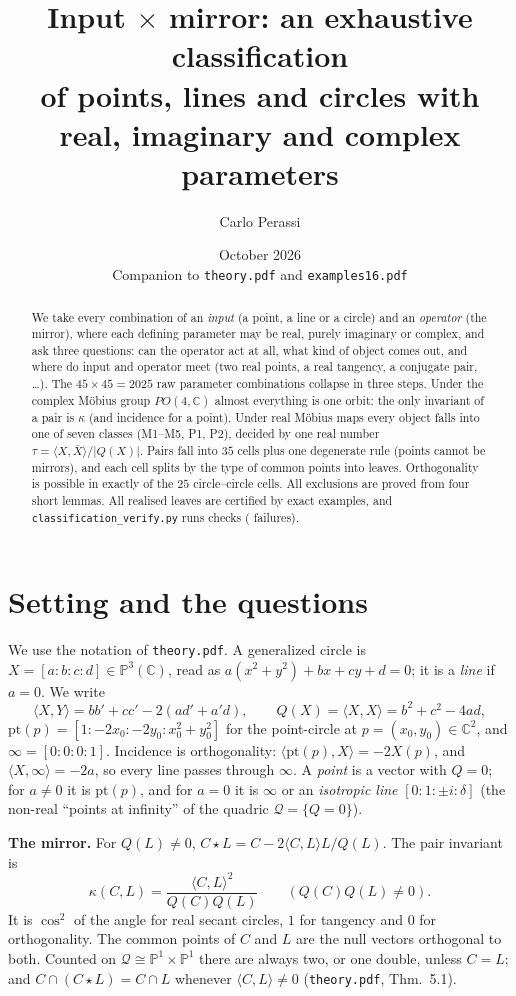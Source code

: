 \documentclass[11pt]{article}
\title{Input $\times$ mirror: an exhaustive classification\\ of points, lines and circles with real, imaginary and complex parameters}
\author{Carlo Perassi}
\date{October 2026\\\small Companion to \texttt{theory.pdf} and \texttt{examples16.pdf}}
\theoremstyle{definition}\newtheorem{definition}[theorem]{Definition}\newtheorem{remark}[theorem]{Remark}\newtheorem{example}[theorem]{Example}
\newcommand{\C}{\mathbb{C}}\newcommand{\R}{\mathbb{R}}\newcommand{\PP}{\mathbb{P}}
\newcommand{\ip}[2]{\langle #1,#2\rangle}\newcommand{\pt}{\mathrm{pt}}\newcommand{\Qd}{\mathcal{Q}}
\newcommand{\cls}[1]{\textsf{#1}}
\begin{document}
\maketitle
\begin{abstract}
We take every combination of an \emph{input} (a point, a line or a circle) and an \emph{operator} (the mirror), where each defining parameter may be real, purely imaginary or complex, and ask three questions: can the operator act at all, what kind of object comes out, and where do input and operator meet (two real points, a real tangency, a conjugate pair, \dots). The $45\times45=2025$ raw parameter combinations collapse in three steps. Under the complex Möbius group $PO(4,\C)$ almost everything is one orbit: the only invariant of a pair is $\kappa$ (and incidence for a point). Under real Möbius maps every object falls into one of seven classes (\cls{M1}--\cls{M5}, \cls{P1}, \cls{P2}), decided by one real number $\tau=\ip X{\bar X}/|Q(X)|$. Pairs fall into $35$ cells plus one degenerate rule (points cannot be mirrors), and each cell splits by the type of common points into \cntleaf{} leaves. Orthogonality is possible in exactly \cntorthcells{} of the $25$ circle--circle cells. All exclusions are proved from four short lemmas. All \cntrows{} realised leaves are certified by exact examples, and \texttt{classification\_verify.py} runs \cntpass{} checks (\cntfail{} failures).
\end{abstract}
\tableofcontents

\section{Setting and the questions}\label{sec:setting}
We use the notation of \texttt{theory.pdf}. A generalized circle is $X=[a:b:c:d]\in\PP^3(\C)$, read as $a(x^2+y^2)+bx+cy+d=0$; it is a \emph{line} if $a=0$. We write
\[\ip XY=bb'+cc'-2(ad'+a'd),\qquad Q(X)=\ip XX=b^2+c^2-4ad,\]
$\pt(p)=[1:-2x_0:-2y_0:x_0^2+y_0^2]$ for the point-circle at $p=(x_0,y_0)\in\C^2$, and $\infty=[0:0:0:1]$. Incidence is orthogonality: $\ip{\pt(p)}X=-2X(p)$, and $\ip X\infty=-2a$, so every line passes through $\infty$. A \emph{point} is a vector with $Q=0$; for $a\neq0$ it is $\pt(p)$, and for $a=0$ it is $\infty$ or an \emph{isotropic line} $[0:1:\pm i:\delta]$ (the non-real ``points at infinity'' of the quadric $\Qd=\{Q=0\}$).

\textbf{The mirror.} For $Q(L)\neq0$, $C\star L=C-2\ip CL L/Q(L)$. The pair invariant is
\[\kappa(C,L)=\frac{\ip CL^2}{Q(C)Q(L)}\qquad(Q(C)Q(L)\neq0).\]
It is $\cos^2$ of the angle for real secant circles, $1$ for tangency and $0$ for orthogonality. The common points of $C$ and $L$ are the null vectors orthogonal to both. Counted on $\Qd\cong\PP^1\times\PP^1$ there are always two, or one double, unless $C=L$; and $C\cap(C\star L)=C\cap L$ whenever $\ip CL\neq0$ (\texttt{theory.pdf}, Thm.~5.1).
\end{document}
